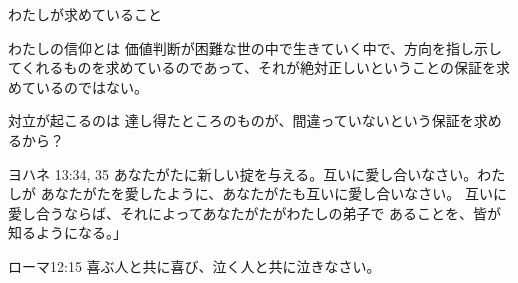 \documentclass[10pt, dvipdfmx]{beamer}
\begin{document}
\begin{frame}{わたしが求めていること}

\begin{alertblock}{わたしの信仰とは}
価値判断が困難な世の中で生きていく中で、方向を指し示してくれるものを求めているのであって、それが絶対正しいということの保証を求めているのではない。
\end{alertblock}

\begin{alertblock}{対立が起こるのは}
達し得たところのものが、間違っていないという保証を求めるから？
\end{alertblock}

\begin{exampleblock}{ヨハネ 13:34, 35}
あなたがたに新しい掟を与える。互いに愛し合いなさい。わたしが
あなたがたを愛したように、あなたがたも互いに愛し合いなさい。
互いに愛し合うならば、それによってあなたがたがわたしの弟子で
あることを、皆が知るようになる。」
\end{exampleblock}

\begin{exampleblock}{ローマ12:15}
喜ぶ人と共に喜び、泣く人と共に泣きなさい。 
\end{exampleblock}

%
%
\end{frame}
\end{document}

